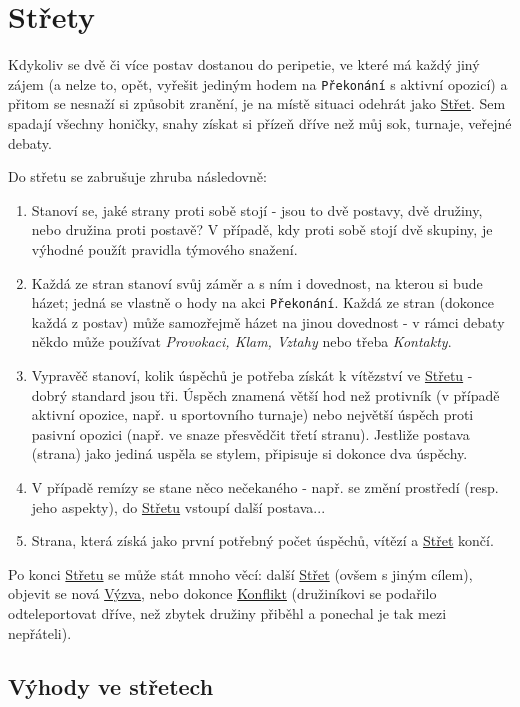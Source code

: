 \section{Střety}
\label{sec:strety}

Kdykoliv se dvě či více postav dostanou do peripetie, ve které má každý jiný zájem (a nelze to, opět, vyřešit jediným hodem na \texttt{Překonání} s aktivní opozicí) a přitom se nesnaží si způsobit zranění, je na místě situaci odehrát jako \underline{Střet}. Sem spadají všechny honičky, snahy získat si přízeň dříve než můj sok, turnaje, veřejné debaty.

Do střetu se zabrušuje zhruba následovně:
\begin{enumerate}
\item Stanoví se, jaké strany proti sobě stojí - jsou to dvě postavy, dvě družiny, nebo družina proti postavě? V případě, kdy proti sobě stojí dvě skupiny, je výhodné použít pravidla týmového snažení.
\item Každá ze stran stanoví svůj záměr a s ním i dovednost, na kterou si bude házet; jedná se vlastně o hody na akci \texttt{Překonání}. Každá ze stran (dokonce každá z postav) může samozřejmě házet na jinou dovednost - v rámci debaty někdo může používat \textit{Provokaci, Klam, Vztahy} nebo třeba \textit{Kontakty}. 

\item Vypravěč stanoví, kolik úspěchů je potřeba získát k vítězství ve \underline{Střetu} - dobrý standard jsou tři. Úspěch znamená větší hod než protivník (v případě aktivní opozice, např. u sportovního turnaje) nebo největší úspěch proti pasivní opozici (např. ve snaze přesvědčit třetí stranu). Jestliže postava (strana) jako jediná uspěla se stylem, připisuje si dokonce dva úspěchy.
\item V případě remízy se stane něco nečekaného - např. se změní prostředí (resp. jeho aspekty), do \underline{Střetu} vstoupí další postava...
\item Strana, která získá jako první potřebný počet úspěchů, vítězí a \underline{Střet} končí.
\end{enumerate}

Po konci \underline{Střetu} se může stát mnoho věcí: další \underline{Střet} (ovšem s jiným cílem), objevit se nová \underline{Výzva}, nebo dokonce \underline{Konflikt} (družiníkovi se podařilo odteleportovat dříve, než zbytek družiny přiběhl a ponechal je tak mezi nepřáteli).

\subsection{Výhody ve střetech}
\label{sec:výhody-střety}

